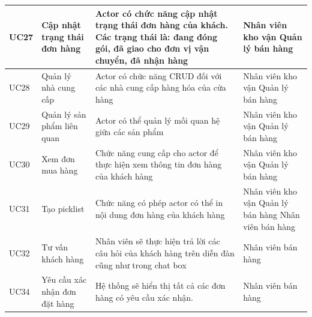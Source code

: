 \documentclass[12pt,a4paper,2sides]{report}
\begin{document}
\begin{tabular}{|p{1cm}|p{3cm}|p{6cm}|p{3cm}|}
\hline
UC27 & Cập nhật trạng thái đơn hàng           & Actor có chức năng cập nhật trạng thái đơn hàng của khách. Các trạng thái là: đang đóng gói, đã giao cho đơn vị vận chuyển, đã nhận hàng                                                                                                 & Nhân viên kho vận Quản lý bán hàng                                      \\ 
\hline
UC28 & Quản lý nhà cung cấp                   & Actor có chức năng CRUD đối với các nhà cung cấp hàng hóa của cửa hàng                                                                                                                                                                   & Nhân viên kho vận Quản lý bán hàng                                      \\ 
\hline
UC29 & Quản lý sản phẩm liên quan             & Actor có thể quản lý mối quan hệ giữa các sản phẩm                                                                                                                                                                                       & Nhân viên kho vận Quản lý bán hàng                                      \\ 
\hline
UC30 & Xem đơn mua hàng                       & Chức năng cung cấp cho actor để thực hiện xem thông tin đơn hàng của khách hàng                                                                                                                                                          & Nhân viên kho vận Quản lý bán hàng                                      \\ 
\hline
UC31 & Tạo picklist                           & Chức năng có phép actor có thể in nội dung đơn hàng của khách hàng                                                                                                                                                                       & Nhân viên kho vận Quản lý bán hàng Nhân viên bán hàng                   \\ 
\hline
UC32 & Tư vấn khách hàng                      & Nhân viên sẽ thực hiện trả lời các câu hỏi của khách hàng trên diễn đàn cũng như trong chat box                                                                                                                                          & Nhân viên bán hàng                                                      \\ 
\hline
UC34 & Yêu cầu xác nhận đơn đặt hàng          & Hệ thống sẽ hiển thị tất cả các đơn hàng có yêu cầu xác nhận.                                                                                                                                                                            & Nhân viên bán hàng                                                      \\ 

\end{tabular}
\end{document}
